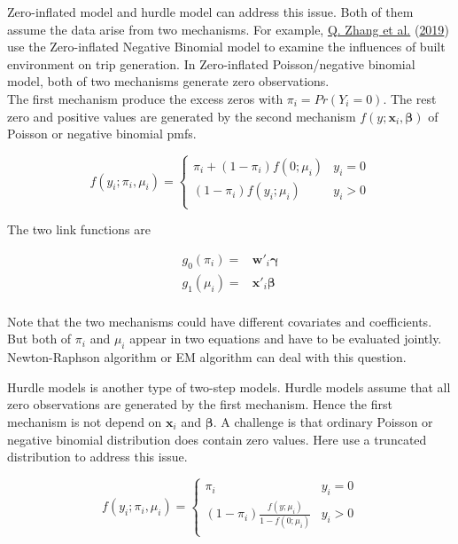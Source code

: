\documentclass[
  11pt,
  openany]{memoir}
\begin{document}
Zero-inflated model and hurdle model can address this issue.
Both of them assume the data arise from two mechanisms.
For example, \protect\hyperlink{ref-zhangHouseholdTripGeneration2019}{Q. Zhang et al.} (\protect\hyperlink{ref-zhangHouseholdTripGeneration2019}{2019}) use the Zero-inflated Negative Binomial model to examine the influences of built environment on trip generation.
In Zero-inflated Poisson/negative binomial model, both of two mechanisms generate zero observations.\\
The first mechanism produce the excess zeros with \(\pi_i=Pr(Y_i=0)\). The rest zero and positive values are generated by the second mechanism \(f(y;\mathbf{x}_i,\boldsymbol\beta)\) of Poisson or negative binomial pmfs.

\begin{equation}
f(y_i;\pi_i,\mu_i)=\begin{cases}\pi_i+(1-\pi_i)f(0;\mu_i)&y_i=0\\
(1-\pi_i)f(y_i;\mu_i)&y_i>0\\
\end{cases}
\label{eq:zi}
\end{equation}

The two link functions are

\begin{equation}
\begin{split}
g_0(\pi_i)=&\mathbf{w}'_i\boldsymbol\gamma\\
g_1(\mu_i)=&\mathbf{x}'_i\boldsymbol\beta\\
\end{split}
\end{equation}

Note that the two mechanisms could have different covariates and coefficients.
But both of \(\pi_i\) and \(\mu_i\) appear in two equations and have to be evaluated jointly. Newton-Raphson algorithm or EM algorithm can deal with this question.

Hurdle models is another type of two-step models.
Hurdle models assume that all zero observations are generated by the first mechanism. Hence the first mechanism is not depend on \(\mathbf{x}_i\) and \(\boldsymbol\beta\).
A challenge is that ordinary Poisson or negative binomial distribution does contain zero values. Here use a truncated distribution to address this issue.

\begin{equation}
f(y_i;\pi_i,\mu_i)=\begin{cases}\pi_i&y_i=0\\
(1-\pi_i)\frac{f(y;\mu_i)}{1-f(0;\mu_i)}&y_i>0\\
\end{cases}
\label{eq:hurdle}
\end{equation}
\end{document}
